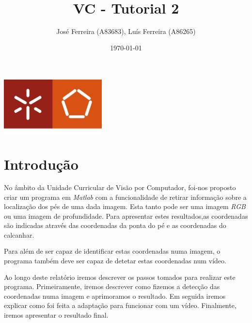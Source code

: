 \documentclass[a4paper]{report}
\begin{document}
\title{VC - Tutorial 2}
\author{José Ferreira (A83683), Luís Ferreira (A86265)}
\date{\today}

\begin{center}
    \begin{minipage}{0.75\linewidth}
        \centering
        \includegraphics[width=0.4\textwidth]{images/eng.jpeg}\par\vspace{1cm}
        \vspace{1.5cm}
        \href{https://www.uminho.pt/PT}
        {\color{black}{\scshape\LARGE Universidade do Minho}} \par
        \vspace{1cm}
        \href{https://www.di.uminho.pt/}
        {\color{black}{\scshape\Large Departamento de Informática}} \par
        \vspace{1.5cm}
        \maketitle
    \end{minipage}
\end{center}

\tableofcontents

\pagebreak
\chapter{Introdução}
No âmbito da Unidade Curricular de Visão por Computador, foi-nos proposto
criar um programa em \textit{Matlab} com a funcionalidade de retirar
informação sobre a localização dos pés de uma dada imagem. Esta tanto
pode ser uma imagem \textit{RGB} ou uma imagem de profundidade. Para apresentar estes
resultados,as coordenadas são indicadas através das
coordenadas da ponta do pé e as coordenadas do calcanhar.

Para além de ser capaz de identificar estas coordenadas numa imagem, o programa
também deve ser capaz de detetar estas coordenadas num vídeo.

Ao longo deste relatório iremos descrever os passos tomados para realizar este
programa. Primeiramente, iremos descrever como fizemos a detecção das
coordenadas numa imagem e aprimoramos o resultado. Em seguida iremos explicar
como foi feita a adaptação para funcionar com um vídeo. Finalmente, iremos
apresentar o resultado final.
\end{document}
